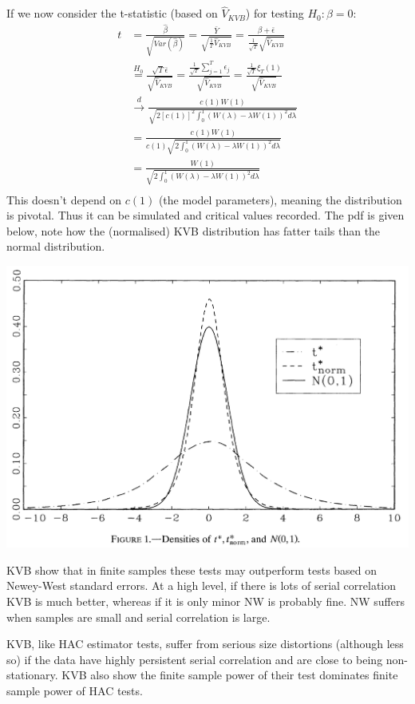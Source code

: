 \documentclass[DIV=14,titlepage=false]{scrreprt}
\begin{document}
If we now consider the t-statistic (based on $\hat V_{KVB}$) for testing $H_0: \beta=0$:
\begin{align*}
    t &= \frac{\hat \beta}{\sqrt{Var(\hat \beta)}}
    = \frac{\bar Y}{\sqrt{\frac{1}{T} \hat V_{KVB}}}
    = \frac{\beta + \bar \epsilon}{\frac{1}{\sqrt{T}}\sqrt{\hat V_{KVB}}}\\
    &\overset{H_0}{=} \frac{\sqrt{T}\bar \epsilon}{ \sqrt{\hat V_{KVB}}}
    = \frac{\frac{1}{\sqrt{T}}\sum_{j=1}^{T}\epsilon_j}{\sqrt{\hat V_{KVB}}}
    = \frac{\frac{1}{\sqrt{T}}\xi_T(1)}{\sqrt{\hat V_{KVB}}}\\
    &\xrightarrow{d} \frac{c(1)W(1)}{\sqrt{2 [c(1)]^2 \int_{0}^{1} \left(W(\lambda) -\lambda W(1)\right)^2 d \lambda}}\\
    &= \frac{c(1)W(1)}{c(1)\sqrt{2 \int_{0}^{1} \left(W(\lambda) -\lambda W(1)\right)^2 d \lambda}}\\
    &= \frac{W(1)}{\sqrt{2 \int_{0}^{1} \left(W(\lambda) -\lambda W(1)\right)^2 d \lambda}}\\
\end{align*}
This doesn't depend on $c(1)$ (the model parameters), meaning the distribution is pivotal. Thus it can be simulated and critical values recorded. The pdf is given below, note how the (normalised) KVB distribution has fatter tails than the normal distribution.

\includegraphics[width=\textwidth]{./Images/KVB.png}

KVB show that in finite samples these tests may outperform tests based on Newey-West standard errors. At a high level, if there is lots of serial correlation KVB is much better, whereas if it is only minor NW is probably fine.  NW suffers when samples are small and serial correlation is large.

KVB, like HAC estimator tests, suffer from serious size distortions (although less so) if the data have highly persistent serial correlation and are close to being non-stationary. KVB also show the finite sample power of their test dominates finite sample power of HAC tests.
\end{document}
